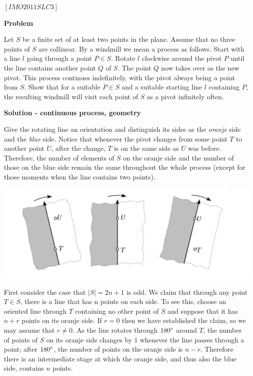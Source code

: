 \begin{problem}
$[IMO2011SLC3]$

\textbf{Problem}

Let $S$ be a ﬁnite set of at least two points in the plane. Assume that no three points of $S$ are collinear. By a windmill we mean a process as follows. Start with a line $l$ going through a point $P \in S$. Rotate $l$ clockwise around the pivot $P$ until the line contains another point $Q$ of $S$. The point $Q$ now takes over as the new pivot. This process continues indeﬁnitely, with the pivot always being a point from $S$. Show that for a suitable $P \in S$ and a suitable starting line $l$ containing $P$, the resulting windmill will visit each point of $S$ as a pivot inﬁnitely often.

\textbf{Solution - continuous process, geometry}

Give the rotating line an orientation and distinguish its sides as the \textit{oranje} side and the \textit{blue} side. Notice that whenever the pivot changes from some point $T$ to another point $U$, after the change, $T$ is on the same side as $U$ was before. Therefore, the number of elements of $S$ on the oranje side and the number of those on the blue side remain the same throughout the whole process (except for those moments when the line contains two points).

\begin{center}
\includegraphics[width=18cm]{windmill.png}
\label{fig:windmill}
\end{center}

First consider the case that $|S| = 2n + 1$ is odd. We claim that through any point $T \in S$, there is a line that has n points on each side. To see this, choose an oriented line through $T$ containing no other point of $S$ and suppose that it has $n + r$ points on its oranje side. If $r = 0$ then we have established the claim, so we may assume that $r \ne 0$. As the line rotates through $180\degree$ around $T$, the number of points of $S$ on its oranje side changes by $1$ whenever the line passes through a point; after $180\degree$, the number of points on the oranje side is $n−r$. Therefore there is an intermediate stage at which the oranje side, and thus also the blue side, contains $n$ points.


\end{problem}
